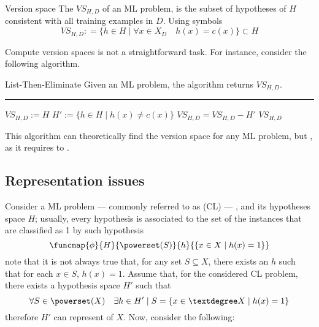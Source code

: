 \documentclass[a4paper, 12pt]{report}
\begin{document}
    \begin{frameddefn}{Version space}
        The  $VS_{H, D}$ of an ML problem, is the subset of hypotheses of $H$ consistent with all training examples in $D$. Using symbols $$VS_{H, D}: = \{h \in H \mid \forall x \in X_D \quad h(x) = c(x)\} \subset H$$
    \end{frameddefn}

    Compute version spaces is not a straightforward task. For instance, consider the following algorithm.

    \begin{framedalgo}[label={lte}]{List-Then-Eliminate}
        Given an ML problem, the algorithm returns $VS_{H, D}$. \\
        \hrule
        \quad
        \begin{algorithmic}[1]
                \State $VS_{H, D} := H$ 
                    \State $H' := \{h \in H \mid h(x) \neq c(x)\}$ 
                    \State $VS_{H, D} = VS_{H, D} - H'$
                \EndFor
                \State {} $VS_{H,D}$
            \EndFunction
        \end{algorithmic}
    \end{framedalgo}

    This algorithm can theoretically find the version space for any ML problem, but , as it requires to .

    \subsection{Representation issues}

    Consider a  ML problem --- commonly referred to as  (CL) --- , and its hypotheses space $H$; usually, every hypothesis is associated to the set of the instances that are classified as 1 by such hypothesis $$\funcmap{\phi}{H}{\powerset(S)}{h}{\{x \in X \mid h(x) = 1\}}$$ note that it is not always true that, for any set $S \subseteq X$, there exists an $h$ such that for each $x \in S$, $h(x) = 1$. Assume that, for the considered CL problem, there exists a hypothesis space $H'$ such that $$\forall S \in \powerset(X) \quad \exists h \in H' \mid S = \{x \in °X \mid h(x)  = 1\}$$ therefore $H'$ can represent  of $X$. Now, consider the following:
\end{document}
